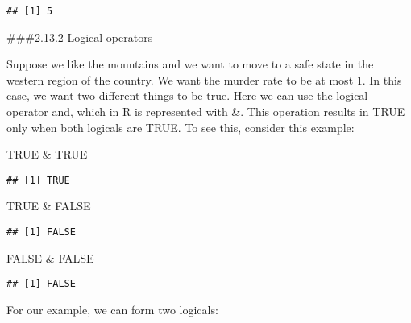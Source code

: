 \documentclass[
]{article}
\newenvironment{Shaded}{\begin{snugshade}}{\end{snugshade}}
\newcommand{\ConstantTok}[1]{\textcolor[rgb]{0.00,0.00,0.00}{#1}}
\newcommand{\DecValTok}[1]{\textcolor[rgb]{0.00,0.00,0.81}{#1}}
\newcommand{\NormalTok}[1]{#1}
\newcommand{\OtherTok}[1]{\textcolor[rgb]{0.56,0.35,0.01}{#1}}
\newcommand{\SpecialCharTok}[1]{\textcolor[rgb]{0.00,0.00,0.00}{#1}}
\newcommand{\StringTok}[1]{\textcolor[rgb]{0.31,0.60,0.02}{#1}}
\begin{document}
\begin{verbatim}
## [1] 5
\end{verbatim}

\#\#\#2.13.2 Logical operators

Suppose we like the mountains and we want to move to a safe state in the
western region of the country. We want the murder rate to be at most 1.
In this case, we want two different things to be true. Here we can use
the logical operator and, which in R is represented with \&. This
operation results in TRUE only when both logicals are TRUE. To see this,
consider this example:

\begin{Shaded}
\begin{Highlighting}[]
\ConstantTok{TRUE} \SpecialCharTok{\&} \ConstantTok{TRUE}
\end{Highlighting}
\end{Shaded}

\begin{verbatim}
## [1] TRUE
\end{verbatim}

\begin{Shaded}
\begin{Highlighting}[]
\ConstantTok{TRUE} \SpecialCharTok{\&} \ConstantTok{FALSE}
\end{Highlighting}
\end{Shaded}

\begin{verbatim}
## [1] FALSE
\end{verbatim}

\begin{Shaded}
\begin{Highlighting}[]
\ConstantTok{FALSE} \SpecialCharTok{\&} \ConstantTok{FALSE}
\end{Highlighting}
\end{Shaded}

\begin{verbatim}
## [1] FALSE
\end{verbatim}

For our example, we can form two logicals:

\begin{Shaded}
\end{Shaded}
\end{document}
